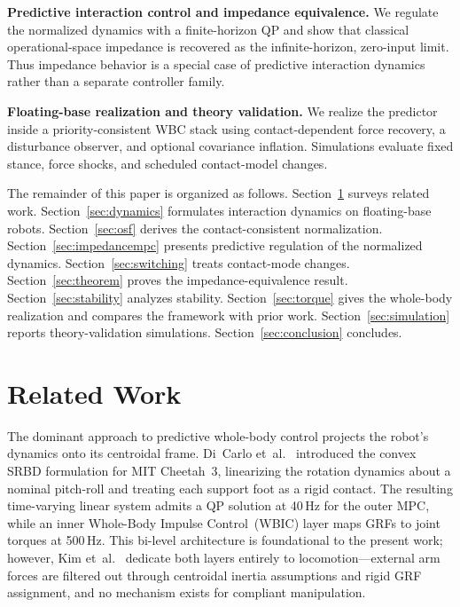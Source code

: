 \textbf{Predictive interaction control and impedance equivalence.}
We regulate the normalized dynamics with a finite-horizon QP and show that
classical operational-space impedance is recovered as the infinite-horizon,
zero-input limit. Thus impedance behavior is a special case of predictive
interaction dynamics rather than a separate controller family.

\textbf{Floating-base realization and theory validation.}
We realize the predictor inside a priority-consistent WBC stack using
contact-dependent force recovery, a disturbance observer, and optional
covariance inflation. Simulations evaluate fixed stance, force shocks, and
scheduled contact-model changes.

The remainder of this paper is organized as follows.
Section~\ref{sec:related} surveys related work.
Section~\ref{sec:dynamics} formulates interaction dynamics on floating-base
robots.
Section~\ref{sec:osf} derives the contact-consistent normalization.
Section~\ref{sec:impedancempc} presents predictive regulation of the
normalized dynamics.
Section~\ref{sec:switching} treats contact-mode changes.
Section~\ref{sec:theorem} proves the impedance-equivalence result.
Section~\ref{sec:stability} analyzes stability.
Section~\ref{sec:torque} gives the whole-body realization and compares the
framework with prior work.
Section~\ref{sec:simulation} reports theory-validation simulations.
Section~\ref{sec:conclusion} concludes.

\section{Related Work}\label{sec:related}

The dominant approach to predictive whole-body control projects the robot's
dynamics onto its centroidal frame.
Di~Carlo et~al.~\cite{dicarlo2018dynamic} introduced the convex SRBD
formulation for MIT Cheetah~3, linearizing the rotation dynamics about a
nominal pitch-roll and treating each support foot as a rigid contact.
The resulting time-varying linear system admits a QP solution at 40\,Hz for
the outer MPC, while an inner Whole-Body Impulse Control~(WBIC) layer maps
GRFs to joint torques at 500\,Hz.
This bi-level architecture is foundational to the present work; however,
Kim et~al.~\cite{kim2019highly} dedicate both layers entirely to
locomotion---external arm forces are filtered out through centroidal inertia
assumptions and rigid GRF assignment, and no mechanism exists for compliant
manipulation.

